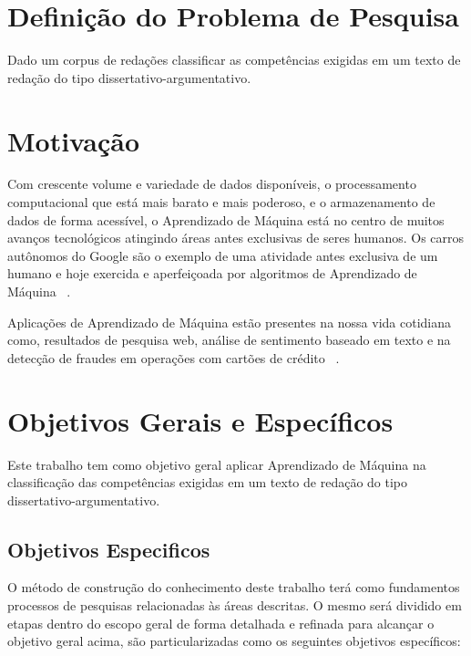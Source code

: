 \section{Definição do Problema de Pesquisa}

Dado um corpus de redações classificar as competências exigidas em um texto de redação do tipo dissertativo-argumentativo.

\section{Motivação}

Com crescente volume e variedade de dados disponíveis, o processamento computacional que está mais barato e mais poderoso, e o armazenamento de dados de forma acessível, o Aprendizado de Máquina está no centro de muitos avanços tecnológicos atingindo áreas antes exclusivas de seres humanos. Os carros autônomos do Google são o exemplo de uma atividade antes exclusiva de um humano e hoje exercida e aperfeiçoada por algoritmos de Aprendizado de Máquina ~\cite{waymo:2017}.

Aplicações de Aprendizado de Máquina estão presentes na nossa vida cotidiana como, resultados de pesquisa web, análise de sentimento baseado em texto e na detecção de fraudes em operações com cartões de crédito ~\cite{batista1999aplicando}.

\section{Objetivos Gerais e Específicos}

Este trabalho tem como objetivo geral aplicar Aprendizado de Máquina na classificação das competências exigidas em um texto de redação do tipo dissertativo-argumentativo.

\subsection{Objetivos Especificos}

O método de construção do conhecimento deste trabalho terá como fundamentos processos de pesquisas relacionadas às áreas descritas. O mesmo será dividido em etapas dentro do escopo geral de forma detalhada e refinada para alcançar o objetivo geral acima, são particularizadas como os seguintes objetivos específicos:

